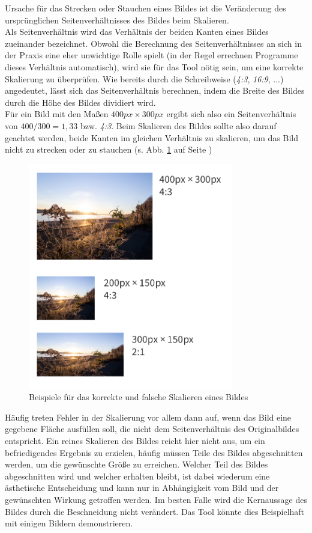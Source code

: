 Ursache für das Strecken oder Stauchen eines Bildes ist die Veränderung des ursprünglichen Seitenverhältnisses des Bildes beim Skalieren. \\
Als Seitenverhältnis wird das Verhältnis der beiden Kanten eines Bildes zueinander bezeichnet. Obwohl die Berechnung des Seitenverhältnisses an sich in der Praxis eine eher unwichtige Rolle spielt (in der Regel errechnen Programme dieses Verhältnis automatisch), wird sie für das Tool nötig sein, um eine korrekte Skalierung zu überprüfen.
Wie bereits durch die Schreibweise (\textit{4:3}, \textit{16:9}, ...)  angedeutet, lässt sich das Seitenverhältnis berechnen, indem die Breite des Bildes durch die Höhe des Bildes dividiert wird. \\
Für ein Bild mit den Maßen $400px \times 300px$ ergibt sich also ein Seitenverhältnis von \(400 / 300 = 1,33\) bzw. \textit{4:3}.
Beim Skalieren des Bildes sollte also darauf geachtet werden, beide Kanten im gleichen Verhältnis zu skalieren, um das Bild nicht zu strecken oder zu stauchen (s. Abb. \ref{fig:scaling} auf Seite \pageref{fig:scaling})

\begin{figure}[h]
    \centering
    \includegraphics[width=0.8\textwidth]{images/scaling.png}
    \caption{Beispiele für das korrekte und falsche Skalieren eines Bildes}
    \label{fig:scaling}
\end{figure}

Häufig treten Fehler in der Skalierung vor allem dann auf, wenn das Bild eine gegebene Fläche ausfüllen soll, die nicht dem Seitenverhältnis des Originalbildes entspricht.
Ein reines Skalieren des Bildes reicht hier nicht aus, um ein befriedigendes Ergebnis zu erzielen, häufig müssen Teile des Bildes abgeschnitten werden, um die gewünschte Größe zu erreichen.
Welcher Teil des Bildes abgeschnitten wird und welcher erhalten bleibt, ist dabei wiederum eine ästhetische Entscheidung und kann nur in Abhängigkeit vom Bild und der gewünschten Wirkung getroffen werden. Im besten Falle wird die Kernaussage des Bildes durch die Beschneidung nicht verändert. Das Tool könnte dies Beispielhaft mit einigen Bildern demonstrieren.

